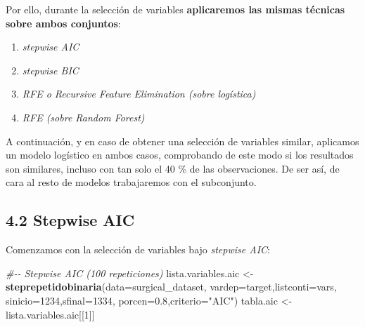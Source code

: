 \documentclass[
]{article}
\newenvironment{Shaded}{\begin{snugshade}}{\end{snugshade}}
\newcommand{\CommentTok}[1]{\textcolor[rgb]{0.56,0.35,0.01}{\textit{#1}}}
\newcommand{\DataTypeTok}[1]{\textcolor[rgb]{0.13,0.29,0.53}{#1}}
\newcommand{\DecValTok}[1]{\textcolor[rgb]{0.00,0.00,0.81}{#1}}
\newcommand{\FloatTok}[1]{\textcolor[rgb]{0.00,0.00,0.81}{#1}}
\newcommand{\KeywordTok}[1]{\textcolor[rgb]{0.13,0.29,0.53}{\textbf{#1}}}
\newcommand{\NormalTok}[1]{#1}
\newcommand{\StringTok}[1]{\textcolor[rgb]{0.31,0.60,0.02}{#1}}
\providecommand{\tightlist}{%
  \setlength{\itemsep}{0pt}\setlength{\parskip}{0pt}}
\begin{document}
Por ello, durante la selección de variables \textbf{aplicaremos las
mismas técnicas sobre ambos conjuntos}:

\begin{enumerate}
\def\labelenumi{\arabic{enumi}.}
\tightlist
\item
  \emph{stepwise AIC}
\item
  \emph{stepwise BIC}
\item
  \emph{RFE o \emph{Recursive Feature Elimination} (sobre logística)}
\item
  \emph{RFE (sobre \emph{Random Forest})}
\end{enumerate}

A continuación, y en caso de obtener una selección de variables similar,
aplicamos un modelo logístico en ambos casos, comprobando de este modo
si los resultados son similares, incluso con tan solo el 40 \% de las
observaciones. De ser así, de cara al resto de modelos trabajaremos con
el subconjunto.

\hypertarget{stepwise-aic}{%
\subsection{4.2 Stepwise AIC}\label{stepwise-aic}}

Comenzamos con la selección de variables bajo \emph{stepwise AIC}:

\begin{Shaded}
\begin{Highlighting}[]
\CommentTok{\#{-}{-} Stepwise AIC (100 repeticiones)}
\NormalTok{lista.variables.aic <{-}}\StringTok{ }\KeywordTok{steprepetidobinaria}\NormalTok{(}\DataTypeTok{data=}\NormalTok{surgical\_dataset,}
                                           \DataTypeTok{vardep=}\NormalTok{target,}\DataTypeTok{listconti=}\NormalTok{vars,}
                                           \DataTypeTok{sinicio=}\DecValTok{1234}\NormalTok{,}\DataTypeTok{sfinal=}\DecValTok{1334}\NormalTok{,}
                                           \DataTypeTok{porcen=}\FloatTok{0.8}\NormalTok{,}\DataTypeTok{criterio=}\StringTok{"AIC"}\NormalTok{)}
\NormalTok{tabla.aic <{-}}\StringTok{ }\NormalTok{lista.variables.aic[[}\DecValTok{1}\NormalTok{]]}
\end{Highlighting}
\end{Shaded}
\end{document}
